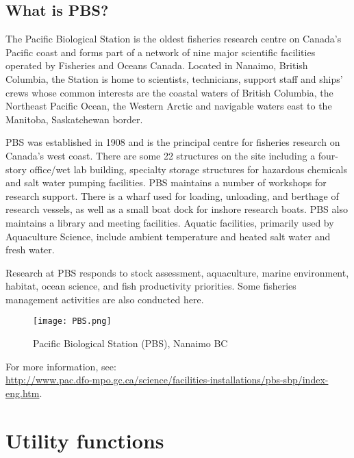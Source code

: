 \documentclass[letterpaper,12pt,fleqn]{article}
\def\tab{\hspace{0.5 in}}
\begin{document}
{} %
\subsection* {What is PBS?}

\tab The Pacific Biological Station is the oldest fisheries research centre on Canada's Pacific coast and forms part of a network of nine major scientific facilities operated by Fisheries and Oceans Canada. Located in Nanaimo, British Columbia, the Station is home to scientists, technicians, support staff and ships' crews whose common interests are the coastal waters of British Columbia, the Northeast Pacific Ocean, the Western Arctic and navigable waters east to the Manitoba, Saskatchewan border.

\tab PBS was established in 1908 and is the principal centre for fisheries research on Canada's west coast. There are some 22 structures on the site including a four-story office/wet lab building, specialty storage structures for hazardous chemicals and salt water pumping facilities. PBS maintains a number of workshops for research support. There is a wharf used for loading, unloading, and berthage of research vessels, as well as a small boat dock for inshore research boats. PBS also maintains a library and meeting facilities. Aquatic facilities, primarily used by Aquaculture Science, include ambient temperature and heated salt water and fresh water. 

\tab Research at PBS responds to stock assessment, aquaculture, marine environment, habitat, ocean science, and fish productivity priorities. Some fisheries management activities are also conducted here. 

\begin{figure}[h!]
	\centering
	\texttt{[image: PBS.png]}
	\quad
	\caption{Pacific Biological Station (PBS), Nanaimo BC}
	\label{fig:PBS}
\end{figure}

For more information, see:\\ \footnotesize
\url{http://www.pac.dfo-mpo.gc.ca/science/facilities-installations/pbs-sbp/index-eng.htm}. \normalsize

\clearpage
\section {Utility functions}
\end{document}
